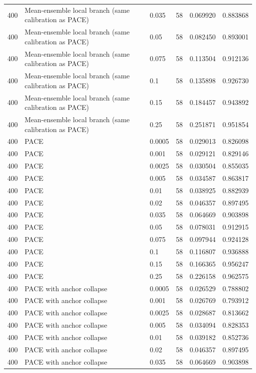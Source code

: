 \begin{tabular}{llllll}
400 & Mean-ensemble local branch (same calibration as PACE) & 0.035 & 58 & 0.069920 & 0.883868 \\
400 & Mean-ensemble local branch (same calibration as PACE) & 0.05 & 58 & 0.082450 & 0.893001 \\
400 & Mean-ensemble local branch (same calibration as PACE) & 0.075 & 58 & 0.113504 & 0.912136 \\
400 & Mean-ensemble local branch (same calibration as PACE) & 0.1 & 58 & 0.135898 & 0.926730 \\
400 & Mean-ensemble local branch (same calibration as PACE) & 0.15 & 58 & 0.184457 & 0.943892 \\
400 & Mean-ensemble local branch (same calibration as PACE) & 0.25 & 58 & 0.251871 & 0.951854 \\
400 & PACE & 0.0005 & 58 & 0.029013 & 0.826098 \\
400 & PACE & 0.001 & 58 & 0.029121 & 0.829146 \\
400 & PACE & 0.0025 & 58 & 0.030504 & 0.855035 \\
400 & PACE & 0.005 & 58 & 0.034587 & 0.863817 \\
400 & PACE & 0.01 & 58 & 0.038925 & 0.882939 \\
400 & PACE & 0.02 & 58 & 0.046357 & 0.897495 \\
400 & PACE & 0.035 & 58 & 0.064669 & 0.903898 \\
400 & PACE & 0.05 & 58 & 0.078031 & 0.912915 \\
400 & PACE & 0.075 & 58 & 0.097944 & 0.924128 \\
400 & PACE & 0.1 & 58 & 0.116807 & 0.936888 \\
400 & PACE & 0.15 & 58 & 0.166365 & 0.956247 \\
400 & PACE & 0.25 & 58 & 0.226158 & 0.962575 \\
400 & PACE with anchor collapse & 0.0005 & 58 & 0.026529 & 0.788802 \\
400 & PACE with anchor collapse & 0.001 & 58 & 0.026769 & 0.793912 \\
400 & PACE with anchor collapse & 0.0025 & 58 & 0.028687 & 0.813662 \\
400 & PACE with anchor collapse & 0.005 & 58 & 0.034094 & 0.828353 \\
400 & PACE with anchor collapse & 0.01 & 58 & 0.039182 & 0.852736 \\
400 & PACE with anchor collapse & 0.02 & 58 & 0.046357 & 0.897495 \\
400 & PACE with anchor collapse & 0.035 & 58 & 0.064669 & 0.903898 \\

\end{tabular}
